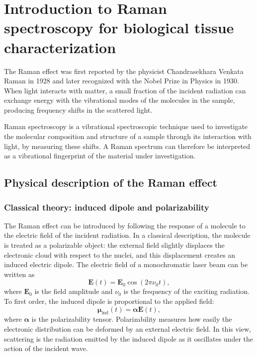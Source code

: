 \chapter{Introduction to Raman spectroscopy for biological tissue characterization}
\label{ch:introduction}

The Raman effect was first reported by the physicist Chandrasekhara Venkata Raman in 1928 and later recognized with the Nobel Prize in Physics in 1930. When light interacts with matter, a small fraction of the incident radiation can exchange energy with the vibrational modes of the molecules in the sample, producing frequency shifts in the scattered light.

Raman spectroscopy is a vibrational spectroscopic technique used to investigate the molecular composition and structure of a sample through its interaction with light, by measuring these shifts. A Raman spectrum can therefore be interpreted as a vibrational fingerprint of the material under investigation.

\section{Physical description of the Raman effect}
\label{sec:theory_raman_effect}

\subsection{Classical theory: induced dipole and polarizability}
\label{subsec:classical_raman}

The Raman effect can be introduced by following the response of a molecule to the electric field of the incident radiation. In a classical description, the molecule is treated as a polarizable object: the external field slightly displaces the electronic cloud with respect to the nuclei, and this displacement creates an induced electric dipole. The electric field of a monochromatic laser beam can be written as
\begin{equation}
    \mathbf{E}(t) = \mathbf{E}_0 \cos(2\pi \nu_0 t),
    \label{eq:incident_field}
\end{equation}
where \(\mathbf{E}_0\) is the field amplitude and \(\nu_0\) is the frequency of the exciting radiation. To first order, the induced dipole is proportional to the applied field:
\begin{equation}
    \boldsymbol{\mu}_{\mathrm{ind}}(t) =
    \boldsymbol{\alpha}\mathbf{E}(t),
    \label{eq:induced_dipole}
\end{equation}
where \(\boldsymbol{\alpha}\) is the polarizability tensor. Polarizability measures how easily the electronic distribution can be deformed by an external electric field. In this view, scattering is the radiation emitted by the induced dipole as it oscillates under the action of the incident wave.

